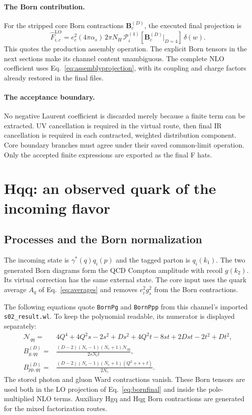 \documentclass[11pt,a4paper]{article}
\newcommand{\Fhat}{\widehat F}
\newcommand{\LO}{\mathrm{LO}}
\begin{document}
\paragraph{The Born contribution.}
For the stripped core Born contractions $\mathbf B_c^{(D)}$, the
executed final projection is
\begin{equation}
 \Fhat_{i,c}^{\LO}
 =e_c^2(4\pi\alpha_s)\,2\pi N_H\,
 \mathcal P_i^{(4)}[\mathbf B_c^{(D)}|_{D=4}]\,\delta(w).
 \label{eq:bornfinal}
\end{equation}
This quotes the production assembly operation. The explicit Born tensors
in the next sections make its channel content unambiguous. The complete
NLO coefficient uses Eq.~\eqref{eq:assemblyprojection}, with its
coupling and charge factors already restored in the final files.

\paragraph{The acceptance boundary.}
No negative Laurent coefficient is discarded merely because a finite
term can be extracted. UV cancellation is required in the virtual route,
then final IR cancellation is required in each contracted, weighted
distribution component. Core boundary branches must agree under their
saved common-limit operation. Only the accepted finite expressions are
exported as the final F hats.

\section{Hqq: an observed quark of the incoming flavor}
\label{sec:hqq}

\subsection{Processes and the Born normalization}

The incoming state is $\gamma^*(q)q_i(p)$ and the tagged parton is
$q_i(k_1)$. The two generated Born diagrams form the QCD Compton
amplitude with recoil $g(k_2)$. Its virtual correction has the same
external state. The core input uses the quark average $A_q$ of
Eq.~\eqref{eq:averages} and removes $e_i^2g_s^2$ from the Born
contractions.

The following equations quote \texttt{BornPg} and \texttt{BornPpp}
from this channel's imported \texttt{s02\_result.wl}. To keep the
polynomial readable, its numerator is displayed separately:
\begin{align}
 \mathcal N_{qq}={}&4Q^4+4Q^2s-2s^2+Ds^2+4Q^2t
                  -8st+2Dst-2t^2+Dt^2,\\
 B_{g,qq}^{(D)}={}&
 \frac{(D-2)(N_c-1)(N_c+1)\mathcal N_{qq}}{2sN_ct},\\
 B_{pp,qq}^{(D)}={}&
 \frac{(D-2)(N_c-1)(N_c+1)(Q^2+s+t)}{2N_c}.
 \label{eq:bornqq}
\end{align}
The stored photon and gluon Ward contractions vanish. These Born tensors
are used both in the LO projection of Eq.~\eqref{eq:bornfinal} and
inside the pole-multiplied NLO terms. Auxiliary Hgq and Hqg Born
contractions are generated for the mixed factorization routes.
\end{document}
